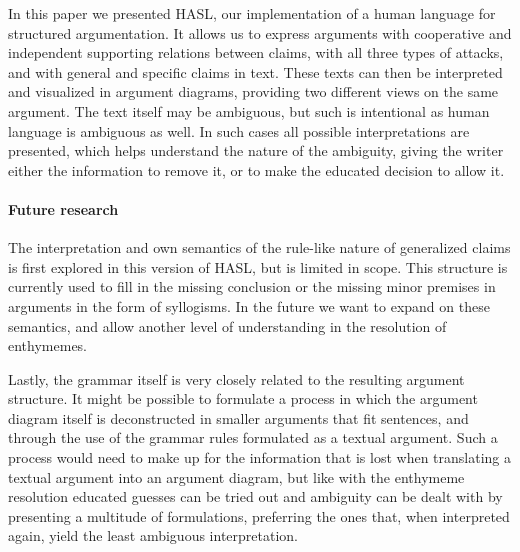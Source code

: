 In this paper we presented HASL, our implementation of a human language for structured argumentation. It allows us to express arguments with cooperative and independent supporting relations between claims, with all three types of attacks, and with general and specific claims in text. These texts can then be interpreted and visualized in argument diagrams, providing two different views on the same argument. The text itself may be ambiguous, but such is intentional as human language is ambiguous as well. In such cases all possible interpretations are presented, which helps understand the nature of the ambiguity, giving the writer either the information to remove it, or to make the educated decision to allow it.

\paragraph{Future research}

The interpretation and own semantics of the rule-like nature of generalized claims is first explored in this version of HASL, but is limited in scope. This structure is currently used to fill in the missing conclusion or the missing minor premises in arguments in the form of syllogisms. In the future we want to expand on these semantics, and allow another level of understanding in the resolution of enthymemes.

Lastly, the grammar itself is very closely related to the resulting argument structure. It might be possible to formulate a process in which the argument diagram itself is deconstructed in smaller arguments that fit sentences, and through the use of the grammar rules formulated as a textual argument. Such a process would need to make up for the information that is lost when translating a textual argument into an argument diagram, but like with the enthymeme resolution educated guesses can be tried out and ambiguity can be dealt with by presenting a multitude of formulations, preferring the ones that, when interpreted again, yield the least ambiguous interpretation.